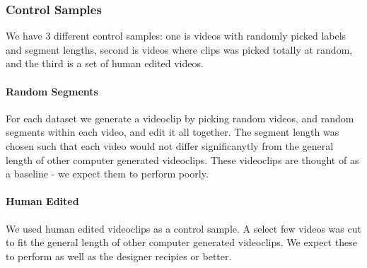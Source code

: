 \subsubsection{Control Samples}
%
We have 3 different control samples: one is videos with randomly picked labels and segment lengths, second is videos where clips was picked totally at random, and the third is a set of human edited videos.
%
\paragraph{Random Segments}
% 
For each dataset we generate a videoclip by picking random videos, and random segments within each video, and edit it all together. The segment length was chosen such that each video would not differ significanytly from the general length of other computer generated videoclips. These videoclips are thought of as a baseline - we expect them to perform poorly.
%
\paragraph{Human Edited}
% 
We used human edited videoclips as a control sample. A select few videos was cut to fit the general length of other computer generated videoclips.
%
%
We expect these to perform as well as the designer recipies or better.
%
